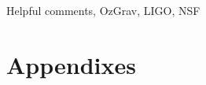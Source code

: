 \documentclass[%
 reprint,
 amsmath,amssymb,
 aps,
]{revtex4}
\begin{document}
\begin{acknowledgments}
Helpful comments, OzGrav, LIGO, NSF

\end{acknowledgments}

\appendix
\section{Appendixes}


\end{document}
